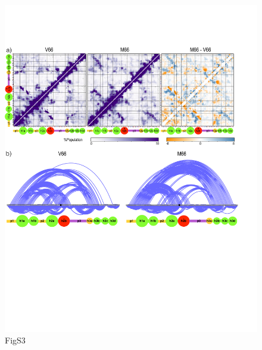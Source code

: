 \documentclass[10pt,letterpaper]{article}
\begin{document}
\begin{figure}[!ht]
\includegraphics[scale=0.5,width=\textwidth,trim={0 0cm 0 0cm},clip]{./figures/S3.pdf}
\caption{{FigS3}}
\end{figure}
\end{document}
